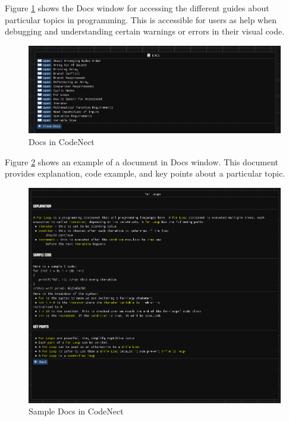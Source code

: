 \parx
Figure \ref{fig:cn_docs} shows the Docs window for accessing the different
guides about particular topics in programming. This is accessible for users as
help when debugging and understanding certain warnings or errors in their
visual code.

\begin{figure}[H]
	\centering
	\captionsetup{justification=centering}
	\captionsetup[figure]{list=yes}
	\includegraphics[width=\linewidth]{media/sc_docs.png}
	\caption[Docs in CodeNect]{Docs in CodeNect}
	\label{fig:cn_docs}
\end{figure}

\parx
Figure \ref{fig:cn_docs_sample} shows an example of a document in Docs window.
This document provides explanation, code example, and key points about
a particular topic.

\begin{figure}[H]
	\centering
	\captionsetup{justification=centering}
	\captionsetup[figure]{list=yes}
	\includegraphics[width=\linewidth]{media/sc_docs_sample_for_loops.png}
	\caption[Sample Docs in CodeNect]{Sample Docs in CodeNect}
	\label{fig:cn_docs_sample}
\end{figure}
